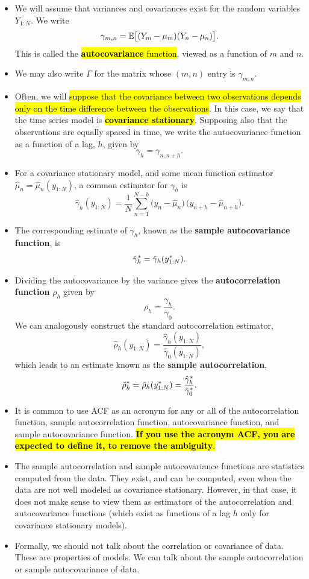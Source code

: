 \documentclass[]{article}
\begin{document}
\begin{itemize}
\item
  We will assume that variances and covariances exist for the random
  variables \(Y_{1:N}\). We write
  \[ \gamma_{m,n} = \mathbb{E}\big[(Y_m-\mu_m)(Y_n-\mu_n)\big].\] This is called
  the \hl{\textbf{autocovariance} function}, viewed as a function of \(m\)
  and \(n\).
\item
  We may also write \(\Gamma\) for the matrix whose \((m,n)\) entry is
  \(\gamma_{m,n}\).
\item
  Often, we will \hl{suppose that the covariance between two observations
  depends only on the time difference between the observations}. In this
  case, we say that the time series model is \hl{\textbf{covariance
  stationary}}. Supposing also that the observations are equally spaced
  in time, we write the autocovariance function as a function of a lag,
  \(h\), given by \[ \gamma_{h} = \gamma_{n,n+h}.\]
\item
  For a covariance stationary model, and some mean function estimator
  \(\hat\mu_n=\hat \mu_n(y_{1:N})\), a common estimator for \(\gamma_h\)
  is
  \[ \hat\gamma_h(y_{1:N}) = \frac{1}{N}\sum_{n=1}^{N-h} \big( {y_n} - \hat\mu_n \big)\, \big({y_{n+h}}-\hat\mu_{n+h} \big).\]
\item
  The corresponding estimate of \(\gamma_h\), known as the
  \textbf{sample autocovariance function}, is
  \[\hat\gamma_h^* = \hat\gamma_h(y_{1:N}^*).\]
\item
  Dividing the autocovariance by the variance gives the
  \textbf{autocorrelation function} \(\rho_h\) given by
  \[ \rho_h = \frac{\gamma_h}{\gamma_0}.\] We can analogously construct
  the standard autocorrelation estimator,
  \[ \hat\rho_h(y_{1:N}) = \frac{\hat\gamma_h(y_{1:N})}{\hat\gamma_0(y_{1:N})},\]
  which leads to an estimate known as the \textbf{sample
  autocorrelation},
  \[ \hat\rho_h^* = \hat\rho_h(y_{1:N}^*)= \frac{\hat\gamma_h^*}{\hat\gamma_0^*}.\]
\item
  It is common to use ACF as an acronym for any or all of the
  autocorrelation function, sample autocorrelation function,
  autocovariance function, and sample autocovariance function.
  \hl{\textbf{If you use the acronym ACF, you are expected to define it, to
  remove the ambiguity}.}
\item
  The sample autocorrelation and sample autocovariance functions are
  statistics computed from the data. They exist, and can be computed,
  even when the data are not well modeled as covariance stationary.
  However, in that case, it does not make sense to view them as
  estimators of the autocorrelation and autocovariance functions (which
  exist as functions of a lag \(h\) only for covariance stationary
  models).
\item
  Formally, we should not talk about the correlation or covariance of
  data. These are properties of models. We can talk about the sample
  autocorrelation or sample autocovariance of data.
\end{itemize}
\end{document}
